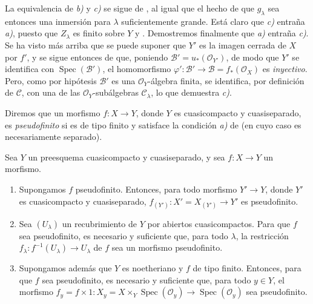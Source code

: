 La equivalencia de \emph{b)} y \emph{c)} se sigue de , al igual que el hecho de que $g_\lambda$ sea entonces una inmersión para $\lambda$ suficientemente grande.
Está claro que \emph{c)} entraña \emph{a)}, puesto que $Z_\lambda$ es finito sobre $Y$  y .
Demostremos finalmente que \emph{a)} entraña \emph{c)}.
Se ha visto más arriba que se puede suponer que $Y'$ es la imagen cerrada de $X$ por $f'$, y se sigue entonces de  que, poniendo $\mathcal B'=u_*(\mathcal O_{Y'})$, de modo que $Y'$ se identifica con $\operatorname{Spec}(\mathcal B')$, el homomorfismo $\varphi':\mathcal B'\to\mathcal B=f_*(\mathcal O_X)$ es \emph{inyectivo}.
Pero, como por hipótesis $\mathcal B'$ es una $\mathcal O_Y$-álgebra finita, se identifica, por definición de $\mathcal C$, con una de las $\mathcal O_Y$-subálgebras $\mathcal C_\lambda$, lo que demuestra \emph{c)}.

Diremos que un morfismo $f:X\to Y$, donde $Y$ es cuasicompacto y cuasiseparado, es \emph{pseudofinito} si es de tipo finito y satisface la condición \emph{a)} de  (en cuyo caso es necesariamente separado).

\begin{corollary}[8.12.4]
\label{IV.8.12.4-fr}
Sea $Y$ un preesquema cuasicompacto y cuasiseparado, y sea $f:X\to Y$ un morfismo.
\begin{enumerate}[label=\textup{(\roman*)}]
  \item Supongamos $f$ pseudofinito.
Entonces, para todo morfismo $Y'\to Y$, donde $Y'$ es cuasicompacto y cuasiseparado, $f_{(Y')}:X'=X_{(Y')}\to Y'$ es pseudofinito.
  \item Sea $(U_\lambda)$ un recubrimiento de $Y$ por abiertos cuasicompactos.
Para que $f$ sea pseudofinito, es necesario y suficiente que, para todo $\lambda$, la restricción $f_\lambda:f^{-1}(U_\lambda)\to U_\lambda$ de $f$ sea un morfismo pseudofinito.
  \item Supongamos además que $Y$ es noetheriano y $f$ de tipo finito.
Entonces, para que $f$ sea pseudofinito, es necesario y suficiente que, para todo $y\in Y$, el morfismo $f_y=f\times 1:X_y=X\times_Y\operatorname{Spec}(\mathcal O_y)
\to\operatorname{Spec}(\mathcal O_y)$ sea pseudofinito.
\end{enumerate}
\end{corollary}

